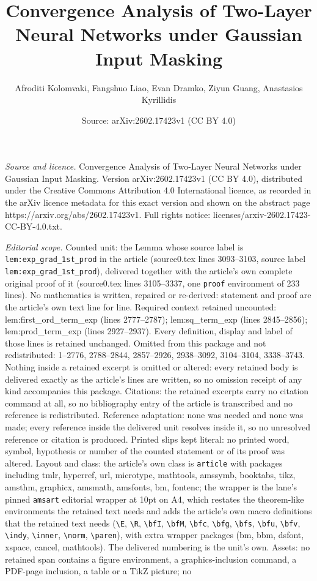 \documentclass[10pt,a4paper]{amsart}
\title[Convergence Analysis of Two-Layer Neural Networks under Gaus]{Convergence Analysis of Two-Layer Neural Networks under Gaussian Input Masking}
\author{Afroditi Kolomvaki, Fangshuo Liao, Evan Dramko, Ziyun Guang, Anastasios Kyrillidis}
\date{Source: arXiv:2602.17423v1 (CC BY 4.0)}
\begin{document}
\maketitle

\noindent\emph{Source and licence.} Convergence Analysis of Two-Layer Neural Networks under Gaussian Input Masking. Version arXiv:2602.17423v1 (CC BY 4.0), distributed under the Creative Commons Attribution 4.0 International licence, as recorded in the arXiv licence metadata for this exact version and shown on the abstract page https://arxiv.org/abs/2602.17423v1. Full rights notice: licenses/arxiv-2602.17423-CC-BY-4.0.txt.\par\smallskip

\noindent\textit{Editorial scope.} Counted unit: the Lemma whose source label is \texttt{lem:exp\_grad\_1st\_prod} in the article (source0.tex lines 3093--3103, source label \texttt{lem:exp\_grad\_1st\_prod}), delivered together with the article's own complete original proof of it (source0.tex lines 3105--3337, one \texttt{proof} environment of 233 lines). No mathematics is written, repaired or re-derived: statement and proof are the article's own text line for line. Required context retained uncounted: lem:first\_ord\_term\_exp (lines 2777--2787); lem:sq\_term\_exp (lines 2845--2856); lem:prod\_term\_exp (lines 2927--2937). Every definition, display and label of those lines is retained unchanged. Omitted from this package and not redistributed: 1--2776, 2788--2844, 2857--2926, 2938--3092, 3104--3104, 3338--3743. Nothing inside a retained excerpt is omitted or altered: every retained body is delivered exactly as the article's lines are written, so no omission receipt of any kind accompanies this package. Citations: the retained excerpts carry no citation command at all, so no bibliography entry of the article is transcribed and no reference is redistributed. Reference adaptation: none was needed and none was made; every reference inside the delivered unit resolves inside it, so no unresolved reference or citation is produced. Printed slips kept literal: no printed word, symbol, hypothesis or number of the counted statement or of its proof was altered. Layout and class: the article's own class is \texttt{article} with packages including tmlr, hyperref, url, microtype, mathtools, amssymb, booktabs, tikz, amsthm, graphicx, amsmath, amsfonts, bm, fontenc; the wrapper is the lane's pinned \texttt{amsart} editorial wrapper at 10pt on A4, which restates the theorem-like environments the retained text needs and adds the article's own macro definitions that the retained text needs (\texttt{\textbackslash E}, \texttt{\textbackslash R}, \texttt{\textbackslash bfI}, \texttt{\textbackslash bfM}, \texttt{\textbackslash bfc}, \texttt{\textbackslash bfg}, \texttt{\textbackslash bfs}, \texttt{\textbackslash bfu}, \texttt{\textbackslash bfv}, \texttt{\textbackslash indy}, \texttt{\textbackslash inner}, \texttt{\textbackslash norm}, \texttt{\textbackslash paren}), with extra wrapper packages (bm, bbm, dsfont, xspace, cancel, mathtools). The delivered numbering is the unit's own. Assets: no retained span contains a figure environment, a graphics-inclusion command, a PDF-page inclusion, a table or a TikZ picture; no 
\end{document}
